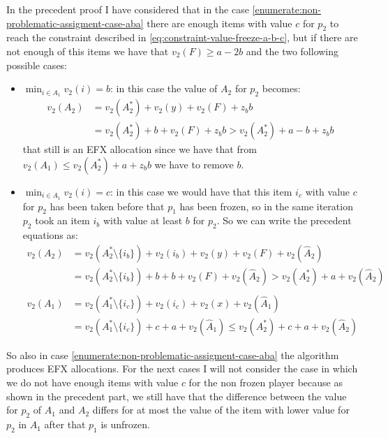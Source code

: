 \documentclass{article}
\begin{document}
In the precedent proof I have considered that in the case \ref{enumerate:non-problematic-assigment-case-aba} there are enough items with value $c$ for $p_2$ to reach the constraint described in \ref{eq:constraint-value-freeze-a-b-c}, but if there are not enough of this items we have that $v_2(F) \ge a-2b$ and the two following possible cases:
\begin{itemize}
        \item $\min_{i\in A_1} v_2(i) = b$: in this case the value of $A_2$ for $p_2$ becomes:
        \begin{align*}
            v_2(A_2) &= v_2(A_2^*) + v_2(y) + v_2(F) + z_b b \\
            &= v_2(A_2^*) + b + v_2(F) + z_bb > v_2(A_2^*) + a-b + z_b b
        \end{align*}
       that still is an EFX allocation since we have that from $v_2(A_1) \le v_2(A_2^*) + a + z_bb$ we have to remove $b$.
        \item $\min_{i\in A_1} v_2(i) = c$: in this case we would have that this item $i_c$ with value $c$ for $p_2$ has been taken before that $p_1$ has been frozen, so in the same iteration $p_2$ took an item $i_b$ with value at least $b$ for $p_2$. So we can write the precedent equations as:
        \begin{align*}
            v_2(A_2) &= v_2(A_2^*\setminus{\{i_b\}}) + v_2(i_b) + v_2(y) + v_2(F) + v_2(\hat A_2) \\
            &= v_2(A_2^*\setminus{\{i_b\}}) + b + b + v_2(F) + v_2(\hat A_2)  > v_2(A_2^*) + a + v_2(\hat A_2)\\\\
            v_2(A_1) &= v_2(A_1^*\setminus{\{i_c\}}) + v_2(i_c)+ v_2(x) + v_2(\hat A_1)  \\
            &=v_2(A_1^*\setminus{\{i_c\}}) + c  + a + v_2(\hat A_1) \le v_2(A_2^*) + c + a + v_2(\hat A_2) 
        \end{align*}
\end{itemize}
So also in case \ref{enumerate:non-problematic-assigment-case-aba} the algorithm produces EFX allocations. For the next cases I will not consider the case in which we do not have enough items with value $c$ for the non frozen player because as shown in the precedent part, we still have that the difference between the value for $p_2$ of $A_1$ and $A_2$ differs for at most the value of the item with lower value for $p_2$ in $A_1$ after that $p_1$ is unfrozen.

\printbibliography %
\end{document}
